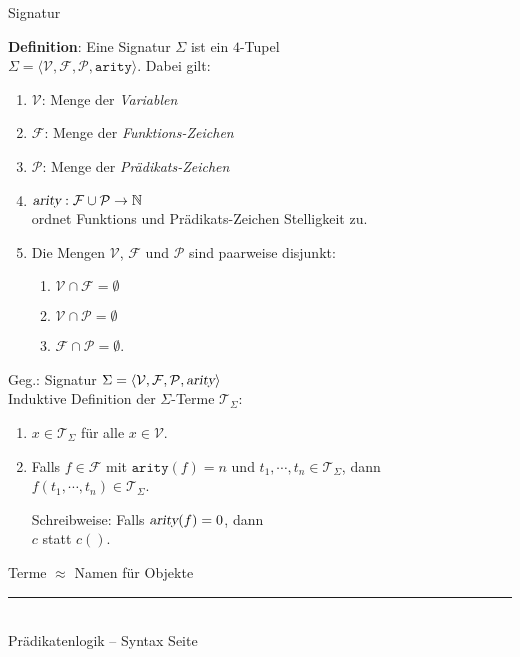 \documentclass{slides}
\newcommand{\myrule}{\rule{20cm}{1mm}\\ }
\newcounter{mypage}
\begin{document}
\begin{slide}{}
\normalsize
\begin{center}
Signatur
\end{center}
\vspace{0.5cm}

\footnotesize
\textbf{Definition}: Eine Signatur $\Sigma$ ist ein $4$-Tupel  \\[0.3cm]
\hspace*{1.3cm} $\Sigma = \langle \mathcal{V}, \mathcal{F}, \mathcal{P},
\mathtt{arity}\rangle$.  \quad
Dabei gilt:
\begin{enumerate}
\item $\mathcal{V}$:  Menge der \emph{Variablen}
\item $\mathcal{F}$:  Menge der \emph{Funktions-Zeichen}
\item $\mathcal{P}$:  Menge der \emph{Prädikats-Zeichen}
\item $\textsl{arity}: \mathcal{F} \cup \mathcal{P} \rightarrow \mathbb{N}$ \\[0.1cm]
      ordnet Funktions und Prädikats-Zeichen Stelligkeit zu.
\item Die Mengen $\mathcal{V}$, $\mathcal{F}$ und $\mathcal{P}$ sind paarweise disjunkt: 
      \begin{enumerate}
      \item $\mathcal{V} \cap \mathcal{F} = \emptyset$
      \item $\mathcal{V} \cap \mathcal{P} = \emptyset$
      \item $\mathcal{F} \cap \mathcal{P} = \emptyset$.
      \end{enumerate}
\end{enumerate}

Geg.: Signatur $\Sigma = \langle \mathcal{V}, \mathcal{F}, \mathcal{P}, \textsl{arity}\rangle$ \\[0.3cm]
\hspace*{1.3cm} 
Induktive Definition der $\Sigma$-Terme $\mathcal{T}_\Sigma$:
\begin{enumerate}
\item $x \in \mathcal{T}_\Sigma$ \quad für alle $x \in \mathcal{V}$.
\item Falls $f \in \mathcal{F}$ mit $\mathtt{arity}(f) = n$  und $t_1,\cdots,t_n \in\mathcal{T}_\Sigma$, dann  \\[0.1cm]
      \hspace*{1.3cm} $f(t_1,\cdots,t_n) \in \mathcal{T}_\Sigma$.
 
      Schreibweise: Falls $\textsl{arity}(f) = 0$, dann \\[0.1cm]
      \hspace*{1.3cm} $c$ \quad statt \quad $c()$.
\end{enumerate}
\begin{center}
{\normalsize
Terme $\approx$ Namen für Objekte }
\end{center}

\vspace*{\fill}
\tiny \addtocounter{mypage}{1}
\myrule
Prädikatenlogik -- Syntax  \hspace*{\fill} Seite 
\end{slide}
\end{document}
